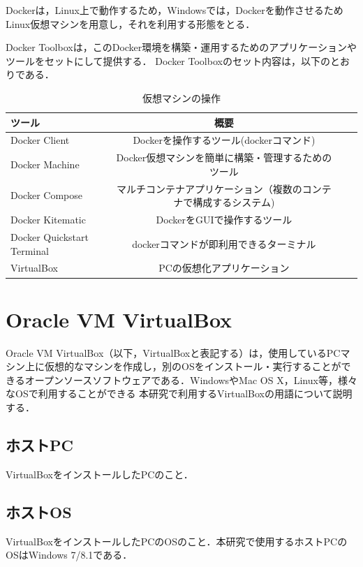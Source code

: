 Dockerは，Linux上で動作するため，Windowsでは，Dockerを動作させるためLinux仮想マシンを用意し，それを利用する形態をとる．

Docker Toolboxは，このDocker環境を構築・運用するためのアプリケーションやツールをセットにして提供する．
Docker Toolboxのセット内容は，以下のとおりである．
\begin{table}[htb]
    \begin{center}
         \caption{仮想マシンの操作}
            \begin{tabular}{|l|c|r||r|} \hline
                ツール & 概要  \\ \hline \hline
                Docker Client & Dockerを操作するツール(dockerコマンド)  \\ \hline
                Docker Machine & Docker仮想マシンを簡単に構築・管理するためのツール  \\ \hline
                Docker Compose & マルチコンテナアプリケーション（複数のコンテナで構成するシステム)  \\ \hline
                Docker Kitematic & DockerをGUIで操作するツール  \\ \hline
                Docker Quickstart Terminal & dockerコマンドが即利用できるターミナル　\\ \hline
                VirtualBox & PCの仮想化アプリケーション  \\ \hline
                \end{tabular}
     \end{center}
\end{table}


\newpage

\section{Oracle VM VirtualBox}
Oracle VM VirtualBox（以下，VirtualBoxと表記する）は，使用しているPCマシン上に仮想的なマシンを作成し，別のOSをインストール・実行することができるオープンソースソフトウェアである．WindowsやMac OS X，Linux等，様々なOSで利用することができる
本研究で利用するVirtualBoxの用語について説明する．
\subsection{ホストPC}
VirtualBoxをインストールしたPCのこと．

\subsection{ホストOS}
VirtualBoxをインストールしたPCのOSのこと．本研究で使用するホストPCのOSはWindows 7/8.1である． 

